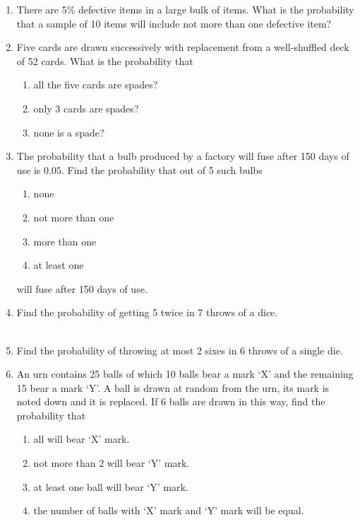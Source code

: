 \begin{enumerate}[label=\thechapter.\arabic*,ref=\thechapter.\theenumi]
\begin{enumerate}
\end{enumerate}
\item There are 5\% defective items in a large bulk of items. What is the probability that a sample of 10 items will include not more than one defective item?
	\\
\solution

\item Five cards are drawn successively with replacement from a well-shuffled deck
of 52 cards. What is the probability that
\begin{enumerate}
    \item all the five cards are spades?
    \item only 3 cards are spades?
    \item none is a spade?
\end{enumerate}
\solution

\item The probability that a bulb produced by a factory will fuse after 150 days of use
is $0.05$. Find the probability that out of 5 such bulbs
\begin{enumerate}
\item  none
\item not more than one
\item more than one
\item at least one
\end{enumerate}
will fuse after 150 days of use.
\\
\solution

\item Find the probability of getting 5 twice in 7 throws of a dice.\\
\\
\solution

\item Find the probability of throwing at most 2 sixes in 6 throws of a single die.\\
\solution

  \item An urn contains 25 balls of which 10 balls bear a mark `X' and the 
    remaining 15 bear a mark `Y'. A ball is drawn at random from the urn, its 
    mark is noted down and it is replaced. If 6 balls are drawn in this way, 
    find the probability that 
    \begin{enumerate}
        \item all will bear `X' mark. 
        \item not more than 2 will bear `Y' mark. 
        \item at least one ball will bear `Y' mark. 
        \item the number of balls with `X' mark and `Y' mark will be equal.
    \end{enumerate}
\solution



\end{enumerate}
